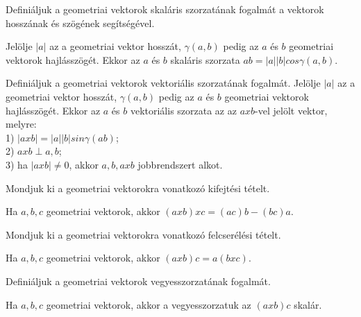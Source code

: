 \begin{frame}
  \begin{tcolorbox}[title={18}]
   Definiáljuk a geometriai vektorok skaláris szorzatának fogalmát a vektorok hosszának és szögének segítségével.

  \tcblower
Jelölje $|a|$ az a geometriai vektor hosszát, ${\gamma}(a,b)$ pedig az $a$ és $b$ geometriai vektorok hajlásszögét. Ekkor az $a$ és $b$ skaláris szorzata $ab = |a||b|cos{\gamma}(a,b)$.

  \end{tcolorbox}
\end{frame}


\begin{frame}
  \begin{tcolorbox}[title={19}]
   Definiáljuk a geometriai vektorok vektoriális szorzatának fogalmát.
  \tcblower
Jelölje $|a|$ az a geometriai vektor hosszát, ${\gamma}(a,b)$ pedig az $a$ és $b$ geometriai vektorok hajlásszögét. Ekkor az $a$ és $b$ vektoriális szorzata az az $a x b$-vel jelölt vektor, melyre:\\

1) $|a x b| = |a||b|sin{\gamma}(ab)$;\\
2) $a x b {\perp} a,b$;\\
3) ha $|a x b| \neq 0$, akkor $a,b,a x b$ jobbrendszert alkot.

  \end{tcolorbox}
\end{frame}


\begin{frame}
  \begin{tcolorbox}[title={20}]
    Mondjuk ki a geometriai vektorokra vonatkozó kifejtési tételt.

  \tcblower
Ha $a,b,c$ geometriai vektorok, akkor $(a x b) x c = (ac)b - (bc)a$.

  \end{tcolorbox}
\end{frame}


\begin{frame}
  \begin{tcolorbox}[title={21}]
    Mondjuk ki a geometriai vektorokra vonatkozó felcserélési tételt.

  \tcblower
    Ha $a,b,c$ geometriai vektorok, akkor $(a x b)c = a(b x c)$. 
  \end{tcolorbox}
\end{frame}


\begin{frame}
  \begin{tcolorbox}[title={22}]
    Definiáljuk a geometriai vektorok vegyesszorzatának fogalmát.

  \tcblower
    Ha $a,b,c$ geometriai vektorok, akkor a vegyesszorzatuk az $(a x b)c$ skalár.

  \end{tcolorbox}
\end{frame}


